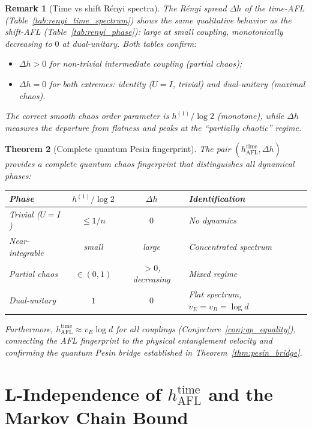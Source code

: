 \documentclass[12pt,a4paper]{article}
\newtheorem{theorem}{Theorem}[section]
\newtheorem{remark}[theorem]{Remark}
\begin{document}
\begin{remark}[Time vs shift Rényi spectra]
  The Rényi spread $\Delta h$ of the \emph{time-AFL} (Table~\ref{tab:renyi_time_spectrum})
  shows the same qualitative behavior as the \emph{shift-AFL}
  (Table~\ref{tab:renyi_phase}): large at small coupling, monotonically
  decreasing to $0$ at dual-unitary.  Both tables confirm:
  \begin{itemize}
    \item $\Delta h > 0$ for \emph{non-trivial intermediate coupling}
      (partial chaos);
    \item $\Delta h = 0$ for both extremes: identity ($U=I$, trivial)
      and dual-unitary (maximal chaos).
  \end{itemize}
  The correct smooth chaos order parameter is $h^{(1)}/\log 2$ (monotone),
  while $\Delta h$ measures the \emph{departure from flatness} and peaks
  at the ``partially chaotic'' regime.
\end{remark}

\begin{theorem}[Complete quantum Pesin fingerprint]
  \label{thm:complete_fingerprint}
  The pair $(h_{\mathrm{AFL}}^{\mathrm{time}}, \Delta h)$ provides a
  complete quantum chaos fingerprint that distinguishes all dynamical phases:
  \begin{center}
  \begin{tabular}{l|cc|l}
  \hline
  Phase & $h^{(1)}/\log 2$ & $\Delta h$ & Identification \\
  \hline
  Trivial ($U=I$) & $\leq 1/n$ & $0$ & No dynamics \\
  Near-integrable & small & large & Concentrated spectrum \\
  Partial chaos   & $\in(0,1)$ & $>0$, decreasing & Mixed regime \\
  Dual-unitary    & $1$ & $0$ & Flat spectrum, $v_E=v_B=\log d$ \\
  \hline
  \end{tabular}
  \end{center}
  Furthermore, $h_{\mathrm{AFL}}^{\mathrm{time}} \approx v_E\log d$ for all
  couplings (Conjecture~\ref{conj:qp_equality}), connecting the AFL fingerprint
  to the physical entanglement velocity and confirming the quantum Pesin bridge
  established in Theorem~\ref{thm:pesin_bridge}.
\end{theorem}

\section{L-Independence of \texorpdfstring{$h_{\mathrm{AFL}}^{\mathrm{time}}$}{h\_AFL}
  and the Markov Chain Bound}
\label{sec:l_independence}
\end{document}
